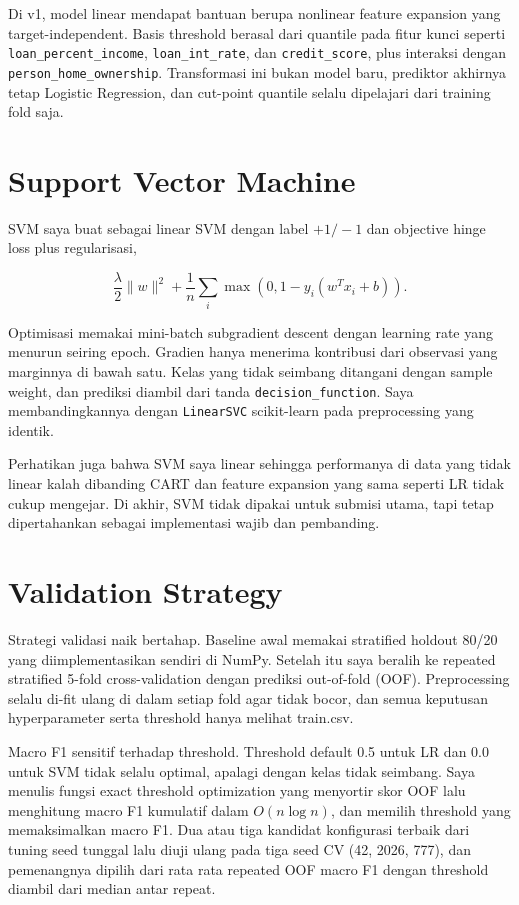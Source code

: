\documentclass[10pt,a4paper]{article}
\begin{document}
Di v1, model linear mendapat bantuan berupa nonlinear feature expansion yang target-independent. Basis threshold berasal dari quantile pada fitur kunci seperti \texttt{loan\_percent\_income}, \texttt{loan\_int\_rate}, dan \texttt{credit\_score}, plus interaksi dengan \texttt{person\_home\_ownership}. Transformasi ini bukan model baru, prediktor akhirnya tetap Logistic Regression, dan cut-point quantile selalu dipelajari dari training fold saja.

\section{Support Vector Machine}

SVM saya buat sebagai linear SVM dengan label $+1/-1$ dan objective hinge loss plus regularisasi,

\[
\frac{\lambda}{2}\lVert w\rVert^2+\frac{1}{n}\sum_i \max(0,1-y_i(w^Tx_i+b)).
\]

Optimisasi memakai mini-batch subgradient descent dengan learning rate yang menurun seiring epoch. Gradien hanya menerima kontribusi dari observasi yang marginnya di bawah satu. Kelas yang tidak seimbang ditangani dengan sample weight, dan prediksi diambil dari tanda \texttt{decision\_function}. Saya membandingkannya dengan \texttt{LinearSVC} scikit-learn pada preprocessing yang identik.

Perhatikan juga bahwa SVM saya linear sehingga performanya di data yang tidak linear kalah dibanding CART dan feature expansion yang sama seperti LR tidak cukup mengejar. Di akhir, SVM tidak dipakai untuk submisi utama, tapi tetap dipertahankan sebagai implementasi wajib dan pembanding.

\section{Validation Strategy}

Strategi validasi naik bertahap. Baseline awal memakai stratified holdout 80/20 yang diimplementasikan sendiri di NumPy. Setelah itu saya beralih ke repeated stratified 5-fold cross-validation dengan prediksi out-of-fold (OOF). Preprocessing selalu di-fit ulang di dalam setiap fold agar tidak bocor, dan semua keputusan hyperparameter serta threshold hanya melihat train.csv.

Macro F1 sensitif terhadap threshold. Threshold default 0.5 untuk LR dan 0.0 untuk SVM tidak selalu optimal, apalagi dengan kelas tidak seimbang. Saya menulis fungsi exact threshold optimization yang menyortir skor OOF lalu menghitung macro F1 kumulatif dalam $O(n\log n)$, dan memilih threshold yang memaksimalkan macro F1. Dua atau tiga kandidat konfigurasi terbaik dari tuning seed tunggal lalu diuji ulang pada tiga seed CV (42, 2026, 777), dan pemenangnya dipilih dari rata rata repeated OOF macro F1 dengan threshold diambil dari median antar repeat.
\end{document}
